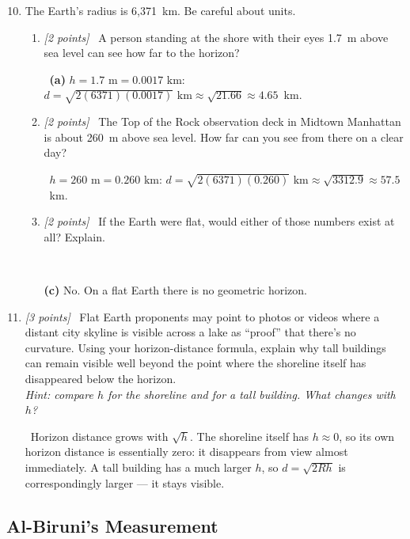 \documentclass[11pt]{article}
\newcommand{\pts}[1]{\textit{[#1 points]}\ }
\newcommand{\ans}[1]{%
  \par\smallskip\noindent{\color{blue!55!black}\textbf{Answer:}}\ #1\par\smallskip}
\begin{document}
\begin{enumerate}
    \setcounter{enumi}{9}
    \item The Earth's radius is 6{,}371~km. Be careful about units.
    \begin{enumerate}[label=(\alph*)]
        \item \pts{2} A person standing at the shore with their eyes 1.7~m above sea
        level can see how far to the horizon?

        \ans{\textbf{(a)} $h=1.7\text{ m}=0.0017\text{ km}$:
    $d=\sqrt{2(6371)(0.0017)}\text{ km}\approx\sqrt{21.66}\approx4.65$~km.}
    
        \item \pts{2} The Top of the Rock observation deck in Midtown Manhattan is
        about 260~m above sea level. How far can you see from there on a
        clear day?

        \ans{$h=260\text{ m}=0.260\text{ km}$:
    $d=\sqrt{2(6371)(0.260)}\text{ km}\approx\sqrt{3312.9}\approx57.5$~km.}

    
        \item \pts{2} If the Earth were flat, would either of those numbers exist at
        all? Explain.

        \ans{

    \textbf{(c)} No. On a flat Earth there is no geometric horizon.}
    \end{enumerate}

    


    \item \pts{3} Flat Earth proponents may point to photos or videos where a
    distant city skyline is visible across a lake as ``proof'' that there's
    no curvature. Using your horizon-distance formula, explain why tall
    buildings can remain visible well beyond the point where the shoreline
    itself has disappeared below the horizon.  \\ \textit{Hint: compare $h$ for the shoreline and for a tall building. What changes with $h$?}

    \ans{Horizon distance grows
with $\sqrt{h}$. The shoreline itself has
$h\approx 0$, so its own horizon distance is essentially zero: it
disappears from view almost immediately. A tall building has a much
larger $h$, so $d=\sqrt{2Rh}$ is correspondingly larger --- it stays
visible.}
\end{enumerate}

\subsection{Al-Biruni's Measurement}
\end{document}
